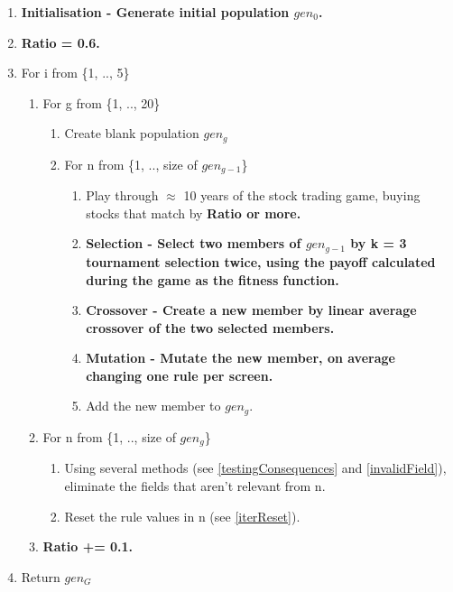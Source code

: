 \begin{enumerate}
    \item \bf Initialisation \rm - Generate initial population $gen_{0}$.
    \item \bf Ratio \rm = 0.6.
    \item For i from \{1, .., 5\}
    \begin{enumerate}
        \item For g from \{1, .., 20\}
        \begin{enumerate}
            \item Create blank population $gen_{g}$
            \item For n from \{1, .., size of $gen_{g-1}$\}
            \begin{enumerate}
                \item Play through $\approx$ 10 years of the stock trading game, buying stocks that match by \bf Ratio \rm or more.
                \item \bf Selection \rm - Select two members of $gen_{g-1}$ by k = 3 tournament selection twice, using the payoff calculated during the game as the fitness function.
                \item \bf Crossover \rm - Create a new member by linear average crossover of the two selected members.
                \item \bf Mutation \rm - Mutate the new member, on average changing one rule per screen.
                \item Add the new member to $gen_{g}$.
            \end{enumerate}
        \end{enumerate}
        \item For n from \{1, .., size of $gen_{g}$\}
        \begin{enumerate}
            \item Using several methods (see \ref{testingConsequences} and \ref{invalidField}), eliminate the fields that aren't relevant from n.
            \item Reset the rule values in n (see \ref{iterReset}).
        \end{enumerate}
        \item \bf Ratio \rm += 0.1.
    \end{enumerate}
    \item Return $gen_{G}$
\end{enumerate}